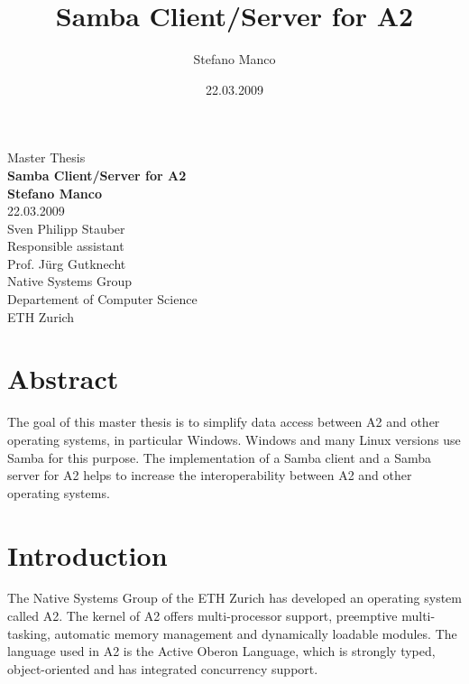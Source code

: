 \documentclass[11pt,a4paper]{book}
\author{Stefano Manco}
\title{Samba Client/Server for A2}
\date{22.03.2009}
\begin{document}
\frontmatter
\begin{titlepage}
\begin{center}
{\large Master Thesis} \\
{\huge\bf Samba Client/Server for A2} \\
{\Large\bf Stefano Manco} \\
22.03.2009 \\
Sven Philipp Stauber \\
{\footnotesize Responsible assistant} \\
Prof. J\"{u}rg Gutknecht \\
Native Systems Group \\
Departement of Computer Science \\
ETH Zurich \\
\end{center}
\end{titlepage}

\chapter*{Abstract}
The goal of this master thesis is to simplify data access between A2 and other operating systems, in particular Windows. Windows and many Linux versions use Samba for this purpose. The implementation of a Samba client and a Samba server for A2 helps to increase the interoperability between A2 and other operating systems. 

\tableofcontents

\mainmatter

\chapter{Introduction}
The Native Systems Group of the ETH Zurich has developed an operating system called A2. The kernel of A2 offers multi-processor support, preemptive multi-tasking, automatic memory management and dynamically loadable modules. The language used in A2 is the Active Oberon Language, which is strongly typed, object-oriented and has integrated concurrency support.
\end{document}
